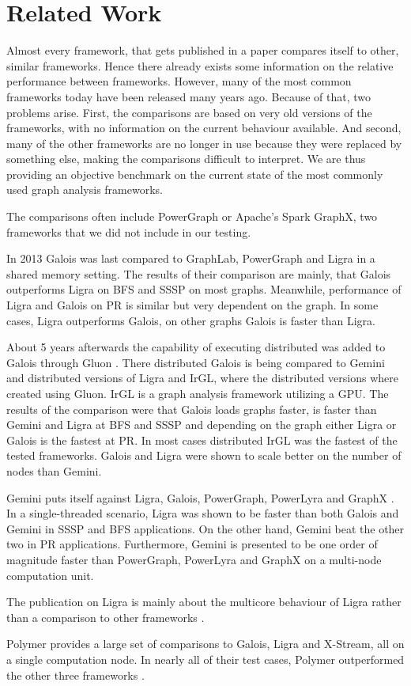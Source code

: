 

\section{Related Work}

Almost every framework, that gets published in a paper compares itself to other, similar frameworks. 
Hence there already exists some information on the relative performance between frameworks. 
However, many of the most common frameworks today have been released many years ago. 
Because of that, two problems arise.
First, the comparisons are based on very old versions of the frameworks, with no information on the current behaviour available. 
And second, many of the other frameworks are no longer in use because they were replaced by something else, making the comparisons difficult to interpret.
We are thus providing an objective benchmark on the current state of the most commonly used graph analysis frameworks. 

The comparisons often include PowerGraph or Apache's Spark GraphX, two frameworks that we did not include in our testing.

In 2013 \cite{Galois} Galois was last compared to GraphLab, PowerGraph and Ligra in a shared memory setting. The results of their comparison are mainly, that Galois outperforms Ligra on BFS and SSSP on most graphs. Meanwhile, performance of Ligra and Galois on PR is similar but very dependent on the graph. In some cases, Ligra outperforms Galois, on other graphs Galois is faster than Ligra.

About 5 years afterwards the capability of executing distributed was added to Galois through Gluon \cite{vertGalois}. 
There distributed Galois is being compared to Gemini and distributed versions of Ligra and IrGL, where the distributed versions where created using Gluon. 
IrGL is a graph analysis framework utilizing a GPU. 
The results of the comparison were that Galois loads graphs faster, is faster than Gemini and Ligra at BFS and SSSP and depending on the graph either Ligra or Galois is the fastest at PR. 
In most cases distributed IrGL was the fastest of the tested frameworks. 
Galois and Ligra were shown to scale better on the number of nodes than Gemini.

Gemini puts itself against Ligra, Galois, PowerGraph, PowerLyra and GraphX \cite{Gemini}.
In a single-threaded scenario, Ligra was shown to be faster than both Galois and Gemini in SSSP and BFS applications. 
On the other hand, Gemini beat the other two in PR applications.
Furthermore, Gemini is presented to be one order of magnitude faster than PowerGraph, PowerLyra and GraphX on a multi-node computation unit.

The publication on Ligra is mainly about the multicore behaviour of Ligra rather than a comparison to other frameworks \cite{Ligra}.

Polymer provides a large set of comparisons to Galois, Ligra and X-Stream, all on a single computation node. In nearly all of their test cases, Polymer outperformed the other three frameworks \cite{Polymer}. 


